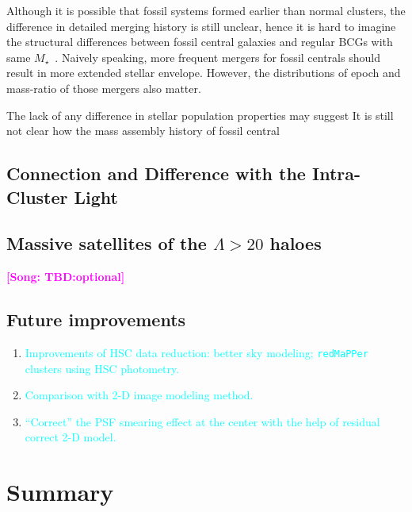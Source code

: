 \documentclass[preprint]{aastex}
\def\mstar{{$M_{\star}$}~}
\newcommand{\plan}[1]{\textcolor{cyan}{#1}}
\newcommand{\song}[1]{\textcolor{magenta}{\textbf{[Song: #1]}}}
\begin{document}
\begin{CJK*}{UTF8}{gbsn}
    Although it is possible that fossil systems formed earlier than normal 
    clusters, the difference in detailed merging history is still unclear, 
    hence it is hard to imagine the structural differences between fossil 
    central galaxies and regular BCGs with same \mstar.  
    Naively speaking, more frequent mergers for fossil centrals should result 
    in more extended stellar envelope.  
    However, the distributions of epoch and mass-ratio of those mergers also 
    matter.  
    
    The lack of any difference in stellar population properties may suggest 
    It is still not clear how the mass assembly history of fossil central 
    

\subsection{Connection and Difference with the Intra-Cluster Light}

\subsection{Massive satellites of the $\Lambda > 20$ haloes}
\song{TBD:optional}

\subsection{Future improvements}

    \begin{enumerate}
        \item \plan{Improvements of HSC data reduction: better sky modeling; 
            \texttt{redMaPPer} clusters using HSC photometry.}
        \item \plan{Comparison with 2-D image modeling method.}
        \item \plan{``Correct'' the PSF smearing effect at the center with the help of 
            residual correct 2-D model.}
    \end{enumerate}


\section{Summary}

   
  

\end{CJK*}
\end{document}
